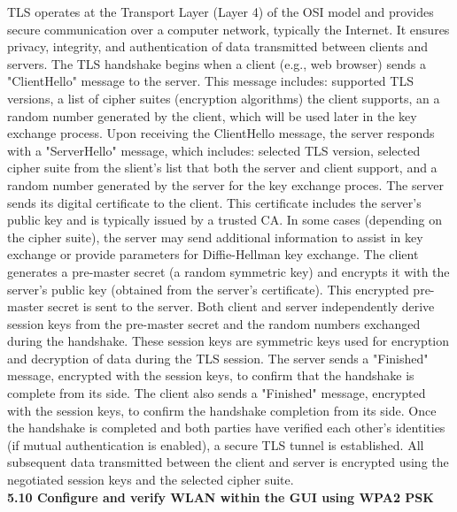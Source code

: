 \documentclass{article}
\begin{document}
	TLS operates at the Transport Layer (Layer 4) of the OSI model and provides secure communication over a computer network, typically the Internet. It ensures privacy, integrity, and authentication of data transmitted between clients and servers. The TLS handshake begins when a client (e.g., web browser) sends a "ClientHello" message to the server. This message includes: supported TLS versions, a list of cipher suites (encryption algorithms) the client supports, an a random number generated by the client, which will be used later in the key exchange process. Upon receiving the ClientHello message, the server responds with a "ServerHello" message, which includes: selected TLS version, selected cipher suite from the slient's list that both the server and client support, and a random number generated by the server for the key exchange proces. The server sends its digital certificate to the client. This certificate includes the server's public key and is typically issued by a trusted CA. In some cases (depending on the cipher suite), the server may send additional information to assist in key exchange or provide parameters for Diffie-Hellman key exchange. The client generates a pre-master secret (a random symmetric key) and encrypts it with the server's public key (obtained from the server's certificate). This encrypted pre-master secret is sent to the server. Both client and server independently derive session keys from the pre-master secret and the random numbers exchanged during the handshake. These session keys are symmetric keys used for encryption and decryption of data during the TLS session. The server sends a "Finished" message, encrypted with the session keys, to confirm that the handshake is complete from its side. The client also sends a "Finished" message, encrypted with the session keys, to confirm the handshake completion from its side. Once the handshake is completed and both parties have verified each other's identities (if mutual authentication is enabled), a secure TLS tunnel is established. All subsequent data transmitted between the client and server is encrypted using the negotiated session keys and the selected cipher suite.\\
  
\textbf{5.10 Configure and verify WLAN within the GUI using WPA2 PSK}\\
\end{document}

